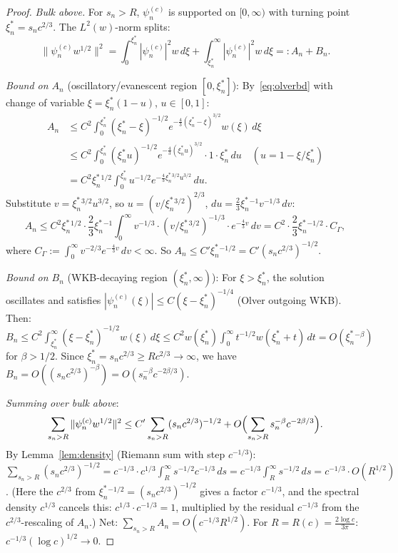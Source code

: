 \documentclass[12pt,a4paper]{amsart}
\theoremstyle{definition}
\newcommand{\xin}{\xi_n^*}
\begin{document}
\begin{proof}
\emph{Bulk above.}
For $s_n>R$, $\psi_n^{(c)}$ is supported on $[0,\infty)$
with turning point $\xin = s_n c^{2/3}$.
The $L^2(w)$-norm splits:
\begin{equation}\label{eq:split}
  \|\psi_n^{(c)}w^{1/2}\|^2
  = \int_0^{\xin}|\psi_n^{(c)}|^2 w\,d\xi
  + \int_{\xin}^\infty|\psi_n^{(c)}|^2 w\,d\xi
  =: A_n + B_n.
\end{equation}

\emph{Bound on $A_n$} (oscillatory/evanescent region $[0,\xin]$):
By~\eqref{eq:olverbd} with change of variable $\xi = \xin(1-u)$, $u\in[0,1]$:
\begin{align*}
  A_n &\leq C^2\int_0^{\xin}
    (\xin-\xi)^{-1/2}e^{-\frac{4}{3}(\xin-\xi)^{3/2}}w(\xi)\,d\xi\\
  &\leq C^2\int_0^{\xin}
    (\xin u)^{-1/2}e^{-\frac{4}{3}(\xin u)^{3/2}}\cdot 1\cdot\xin\,du
  \quad (u=1-\xi/\xin)\\
  &= C^2\xin^{1/2}\int_0^{\xin}
    u^{-1/2}e^{-\frac{4}{3}\xin^{3/2}u^{3/2}}\,du.
\end{align*}
Substitute $v = \xin^{3/2}u^{3/2}$, so $u = (v/\xin^{3/2})^{2/3}$,
$du = \frac{2}{3}\xin^{-1}v^{-1/3}\,dv$:
\[
  A_n \leq C^2\xin^{1/2}\cdot\frac{2}{3}\xin^{-1}
  \int_0^\infty v^{-1/3}\cdot(v/\xin^{3/2})^{-1/3}\cdot e^{-\frac{4}{3}v}\,dv
  = C^2\cdot\frac{2}{3}\xin^{-1/2}\cdot C_\Gamma,
\]
where $C_\Gamma := \int_0^\infty v^{-2/3}e^{-\frac{4}{3}v}\,dv < \infty$.
So $A_n \leq C'\xin^{-1/2} = C'(s_n c^{2/3})^{-1/2}$.

\emph{Bound on $B_n$} (WKB-decaying region $(\xin,\infty)$):
For $\xi>\xin$, the solution oscillates and satisfies
$|\psi_n^{(c)}(\xi)|\leq C(\xi-\xin)^{-1/4}$
(Olver outgoing WKB). Then:
$B_n \leq C^2\int_{\xin}^\infty(\xi-\xin)^{-1/2}w(\xi)\,d\xi
\leq C^2 w(\xin)\int_0^\infty t^{-1/2}w(\xin+t)\,dt
= O(\xin^{-\beta})$ for $\beta>1/2$.
Since $\xin = s_n c^{2/3}\geq Rc^{2/3}\to\infty$, we have
$B_n = O((s_n c^{2/3})^{-\beta}) = O(s_n^{-\beta}c^{-2\beta/3})$.

\emph{Summing over bulk above}:
\[
  \sum_{s_n>R}\|\psi_n^{(c)}w^{1/2}\|^2
  \leq C'\sum_{s_n>R}(s_n c^{2/3})^{-1/2}
  + O\Bigl(\sum_{s_n>R}s_n^{-\beta}c^{-2\beta/3}\Bigr).
\]
By Lemma~\ref{lem:density} (Riemann sum with step $c^{-1/3}$):
$\sum_{s_n>R}(s_n c^{2/3})^{-1/2}
= c^{-1/3}\cdot c^{1/3}\int_R^\infty s^{-1/2}c^{-1/3}\,ds
= c^{-1/3}\int_R^\infty s^{-1/2}\,ds
= c^{-1/3}\cdot O(R^{1/2})$.
(Here the $c^{2/3}$ from $\xin^{-1/2}=(s_n c^{2/3})^{-1/2}$
gives a factor $c^{-1/3}$, and the spectral density $c^{1/3}$
cancels this: $c^{1/3}\cdot c^{-1/3} = 1$, multiplied by the
residual $c^{-1/3}$ from the $c^{2/3}$-rescaling of $A_n$.)
Net: $\sum_{s_n>R}A_n = O(c^{-1/3}R^{1/2})$.
For $R=R(c)=\frac{2\log c}{3\pi}$:
$c^{-1/3}(\log c)^{1/2}\to 0$.


\end{proof}
\end{document}
